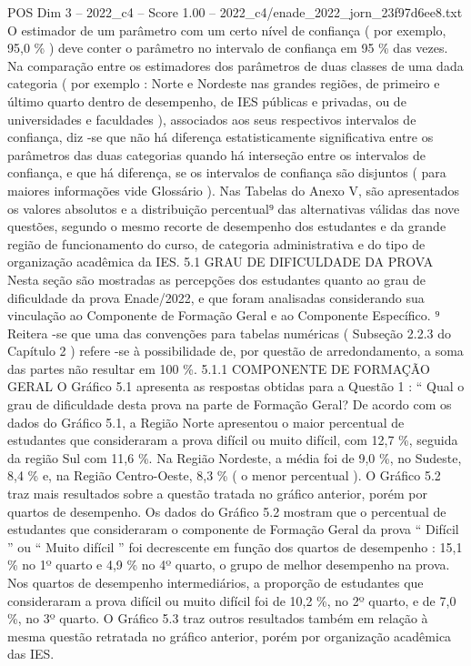 \begin{textsample}{POS Dim 3 – 2022\_c4 – Score 1.00 – 2022\_c4/enade\_2022\_jorn\_23f97d6ee8.txt}
O estimador de um parâmetro com um certo nível de confiança ( por exemplo, 95,0 \% ) deve conter o parâmetro no intervalo de confiança em 95 \% das vezes.
Na comparação entre os estimadores dos parâmetros de duas classes de uma dada categoria ( por exemplo : Norte e Nordeste nas grandes regiões, de primeiro e último quarto dentro de desempenho, de IES públicas e privadas, ou de universidades e faculdades ), associados aos seus respectivos intervalos de confiança, diz -se que não há diferença estatisticamente significativa entre os parâmetros das duas categorias quando há interseção entre os intervalos de confiança, e que há diferença, se os intervalos de confiança são disjuntos ( para maiores informações vide Glossário ).
Nas Tabelas do Anexo V, são apresentados os valores absolutos e a distribuição percentual⁹ das alternativas válidas das nove questões, segundo o mesmo recorte de desempenho dos estudantes e da grande região de funcionamento do curso, de categoria administrativa e do tipo de organização acadêmica da IES. 5.1 GRAU DE DIFICULDADE DA PROVA Nesta seção são mostradas as percepções dos estudantes quanto ao grau de dificuldade da prova Enade/2022, e que foram analisadas considerando sua vinculação ao Componente de Formação Geral e ao Componente Específico. ⁹ Reitera -se que uma das convenções para tabelas numéricas ( Subseção 2.2.3 do Capítulo 2 ) refere -se à possibilidade de, por questão de arredondamento, a soma das partes não resultar em 100 \%. 5.1.1 COMPONENTE DE FORMAÇÃO GERAL O Gráfico 5.1 apresenta as respostas obtidas para a Questão 1 : “ Qual o grau de dificuldade desta prova na parte de Formação Geral?
De acordo com os dados do Gráfico 5.1, a Região Norte apresentou o maior percentual de estudantes que consideraram a prova difícil ou muito difícil, com 12,7 \%, seguida da região Sul com 11,6 \%.
Na Região Nordeste, a média foi de 9,0 \%, no Sudeste, 8,4 \% e, na Região Centro-Oeste, 8,3 \% ( o menor percentual ).
O Gráfico 5.2 traz mais resultados sobre a questão tratada no gráfico anterior, porém por quartos de desempenho.
Os dados do Gráfico 5.2 mostram que o percentual de estudantes que consideraram o componente de Formação Geral da prova “ Difícil ” ou “ Muito difícil ” foi decrescente em função dos quartos de desempenho : 15,1 \% no 1º quarto e 4,9 \% no 4º quarto, o grupo de melhor desempenho na prova.
Nos quartos de desempenho intermediários, a proporção de estudantes que consideraram a prova difícil ou muito difícil foi de 10,2 \%, no 2º quarto, e de 7,0 \%, no 3º quarto.
O Gráfico 5.3 traz outros resultados também em relação à mesma questão retratada no gráfico anterior, porém por organização acadêmica das IES.

\end{textsample}
